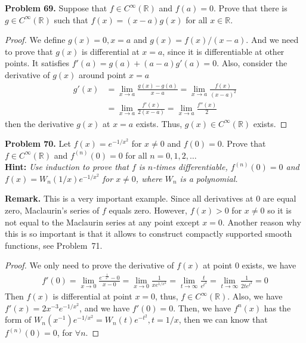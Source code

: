 \documentclass[12pt,leqno]{amsart}
\begin{document}
\medskip

\noindent
{\bf Problem 69.}
Suppose that $f\in C^\infty(\mathbb{R})$ and $f(a)=0$. Prove that there is $g\in C^\infty(\mathbb{R})$ such that $f(x)=(x-a)g(x)$ for all $x\in\mathbb{R}$.
\begin{proof}
We define $g(x)=0, x=a$ and $g(x)=f(x)/(x-a)$. And we need to prove that $g(x)$ is differential at $x=a$, since it is differentiable at other points. It satisfies $f'(a)=g(a)+(a-a)g'(a)=0$. Also, consider the derivative of $g(x)$ around point $x=a$
\begin{align*}
    g'(x) &= \lim_{x\to a}\frac{g(x)-g(a)}{x-a} = \lim_{x\to a}\frac{f(x)}{(x-a)^2} \\
    &= \lim_{x\to a}\frac{f'(x)}{2(x-a)} = \lim_{x\to a}\frac{f''(x)}{2}
\end{align*}
then the derivative $g(x)$ at $x=a$ exists. Thus, $g(x)\in C^\infty(\mathbb{R})$ exists.
\end{proof}

\medskip

\noindent
{\bf Problem 70.}
Let $f(x)=e^{-1/x^2}$ for $x\neq 0$ and $f(0)=0$. Prove that $f\in C^\infty(\mathbb{R})$ and $f^{(n)}(0)=0$ for all $n=0,1,2,\ldots$\\
{\bf Hint:} {\em Use induction to prove that $f$ is $n$-times differentiable, $f^{(n)}(0)=0$ and $f(x)=W_n(1/x)e^{-1/x^2}$ for $x\neq 0$, where $W_n$ is a polynomial.}

\noindent
{\bf Remark.}
This is a very important example. Since all derivatives at $0$ are equal zero, Maclaurin's series of $f$ equals zero. However, $f(x)>0$ for $x\neq 0$ so it is not equal to the Maclaurin series at any point except $x=0$. Another reason why this is so important is that it allows to construct compactly supported smooth functions, see Problem~71.
\begin{proof}
We only need to prove the derivative of $f(x)$ at point $0$ exists, we have 
\begin{align*}
    f'(0)=\lim_{x\rightarrow 0}\frac{e^{-\frac{1}{x^2}}-0}{x-0} = \lim_{x\rightarrow 0}\frac{1}{x e^{1/x^2}} = \lim_{t\to\infty}\frac{t}{e^{t^2}} = \lim_{t\to\infty}\frac{1}{2te^{t^2}} = 0
\end{align*}
Then $f(x)$ is differential at point $x=0$, thus, $f\in C^\infty(\mathbb{R})$. Also, we have $f'(x)=2x^{-3}e^{-1/x^2}$, and we have $f'(0)=0$. Then, we have $f^{n}(x)$ has the form of $W_n(x^{-1})e^{-1/x^2} = W_n(t)e^{-t^2}, t=1/x$, then we can know that $f^{(n)}(0)=0$, for $\forall n$.
\end{proof}
\end{document}
